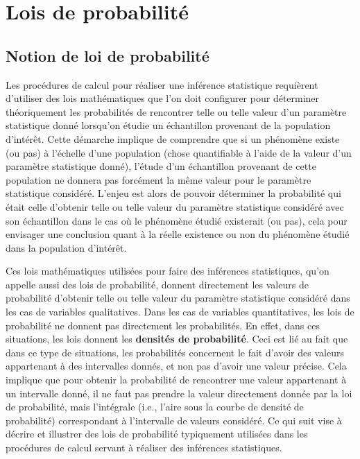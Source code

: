 \documentclass[
  letterpaper,
]{book}
\begin{document}
\section{Lois de probabilité}\label{lois-de-probabilituxe9}

\subsection{Notion de loi de
probabilité}\label{notion-de-loi-de-probabilituxe9}

Les procédures de calcul pour réaliser une inférence statistique
requièrent d'utiliser des lois mathématiques que l'on doit configurer
pour déterminer théoriquement les probabilités de rencontrer telle ou
telle valeur d'un paramètre statistique donné lorsqu'on étudie un
échantillon provenant de la population d'intérêt. Cette démarche
implique de comprendre que si un phénomène existe (ou pas) à l'échelle
d'une population (chose quantifiable à l'aide de la valeur d'un
paramètre statistique donné), l'étude d'un échantillon provenant de
cette population ne donnera pas forcément la même valeur pour le
paramètre statistique considéré. L'enjeu est alors de pouvoir déterminer
la probabilité qui était celle d'obtenir telle ou telle valeur du
paramètre statistique considéré avec son échantillon dans le cas où le
phénomène étudié existerait (ou pas), cela pour envisager une conclusion
quant à la réelle existence ou non du phénomène étudié dans la
population d'intérêt.

Ces lois mathématiques utilisées pour faire des inférences statistiques,
qu'on appelle aussi des lois de probabilité, donnent directement les
valeurs de probabilité d'obtenir telle ou telle valeur du paramètre
statistique considéré dans les cas de variables qualitatives. Dans les
cas de variables quantitatives, les lois de probabilité ne donnent pas
directement les probabilités. En effet, dans ces situations, les lois
donnent les \textbf{densités de probabilité}. Ceci est lié au fait que
dans ce type de situations, les probabilités concernent le fait d'avoir
des valeurs appartenant à des intervalles donnés, et non pas d'avoir une
valeur précise. Cela implique que pour obtenir la probabilité de
rencontrer une valeur appartenant à un intervalle donné, il ne faut pas
prendre la valeur directement donnée par la loi de probabilité, mais
l'intégrale (i.e., l'aire sous la courbe de densité de probabilité)
correspondant à l'intervalle de valeurs considéré. Ce qui suit vise à
décrire et illustrer des lois de probabilité typiquement utilisées dans
les procédures de calcul servant à réaliser des inférences statistiques.
\end{document}
